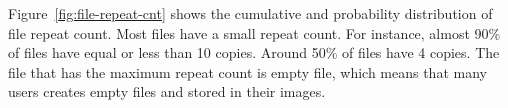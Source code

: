 Figure~\ref{fig:file-repeat-cnt} shows the cumulative and probability distribution of file repeat count. 
Most files have a small repeat count. For instance, almost 90\% of files have equal or less than 10 copies. Around 50\% of files have 4 copies.
The file that has the maximum repeat count is empty file, which means that many users creates empty files and stored in their images.
